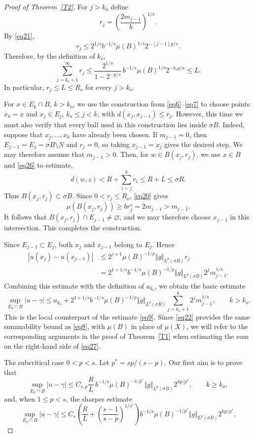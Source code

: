 \documentclass[10pt,a4paper]{amsart}
\begin{document}
\begin{proof}[Proof of Theorem~\ref{T2}]
For $j>k_o$ define
\[
 r_j=\left(\frac{2m_{j-1}}b\right)^{1/s}.
\]
By \eqref{eq21},
\[
 r_j\leq2^{1/s}b^{-1/s}\mu(B)^{1/s}2^{-(j-1)p/s}.
\]
Therefore, by the definition of $k_o$,
\begin{equation}
\label{eq26}
 \sum_{j=k_o+1}^{\infty}r_j
 \leq\frac{2^{1/s}}{1-2^{-p/s}}\,
 b^{-1/s}\mu(B)^{1/s}2^{-k_op/s}
 \leq L.
\end{equation}
In particular, $r_j\leq L\leq R_o$ for every $j>k_o$.

For $x\in E_k\cap B$, $k>k_o$, we use the construction from
\eqref{eq6}--\eqref{eq7} to choose points $x_k=x$ and $x_j\in E_j$,
$k_o\leq j<k$, with $d(x_j,x_{j-1})\leq r_j$. However, this time we must also verify that every ball used in this construction lies inside $\sigma B$.
Indeed, suppose that $x_j,\ldots,x_k$ have already been chosen. 
If $m_{j-1}=0$, then
$E_{j-1}=E_j=\sigma B\setminus N$ and $r_j=0$, so taking
$x_{j-1}=x_j$ gives the desired step. We may therefore assume
that $m_{j-1}>0$. Then, for $w\in B(x_j,r_j)$, we use $x\in B$ and \eqref{eq26} to estimate,
\[
 d(w,z)<R+\sum_{i=j}^k r_i\leq R+L\leq\sigma R.
\]
Thus $B(x_j,r_j)\subset\sigma B$. Since $0<r_j\leq R_o$, \eqref{eq20} gives
\[
 \mu(B(x_j,r_j))\geq br_j^s=2m_{j-1}>m_{j-1}.
\]
It follows that $B(x_j,r_j)\cap E_{j-1}\neq\varnothing$, and we may therefore choose $x_{j-1}$ in this intersection. This completes the construction.


Since $E_{j-1}\subset E_j$, both $x_j$ and $x_{j-1}$ belong to $E_j$. Hence
\begin{align*}
|u(x_j)-u(x_{j-1})|
&\leq2^{j+1}\mu(B)^{-1/p}\Vert g\Vert_{L^p(\sigma B)}r_j
\\
&=2^{1+1/s}b^{-1/s}\mu(B)^{-1/p}\Vert g\Vert_{L^p(\sigma B)}
2^jm_{j-1}^{1/s}.
\end{align*}
Combining this estimate with the definition of $a_{k_o}$, we obtain the basic estimate
\begin{equation}
\label{eq27}
 \sup_{E_k\cap B}|u-\gamma|
 \leq a_{k_o}
 +2^{1+1/s}b^{-1/s}\mu(B)^{-1/p}\Vert g\Vert_{L^p(\sigma B)}
 \sum_{j=k_o+1}^k2^jm_{j-1}^{1/s},
 \qquad k>k_o.
\end{equation}
This is the local counterpart of the estimate \eqref{eq9}. 
Since \eqref{eq22} provides the same summability
bound as \eqref{eq8}, with $\mu(B)$ in place of $\mu(X)$,
we will refer to the corresponding arguments
in the proof of Theorem~\ref{T1} when estimating the sum
on the right-hand side of \eqref{eq27}.


\medskip
\noindent
{\sc The subcritical case $0<p<s$.}
Let $p^*=sp/(s-p)$. Our first aim is to prove that
\begin{equation}
\label{eq28}
 \sup_{E_k\cap B}|u-\gamma|
 \leq C_{s,p}\frac RL\,b^{-1/s}\mu(B)^{-1/p^*}
 \Vert g\Vert_{L^p(\sigma B)}2^{kp/p^*},
 \qquad k\geq k_o,
\end{equation}
and, when $1\leq p<s$, the sharper estimate
\begin{equation}
\label{eq29}
 \sup_{E_k\cap B}|u-\gamma|
 \leq C_s\left(
 \frac RL+\left(\frac{s-1}{s-p}\right)^{1/s'}
 \right)b^{-1/s}\mu(B)^{-1/p^*}
 \Vert g\Vert_{L^p(\sigma B)}2^{kp/p^*}.
\end{equation}



\end{proof}
\end{document}
